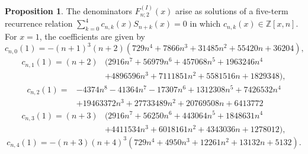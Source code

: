 \documentclass[a4paper,12pt,oneside]{article}
\theoremstyle{definition}
\newtheorem{prop}[defi]{Proposition}
\newcommand{\Z}{\mathbb{Z}}
\begin{document}
\begin{prop}
    The denominators $F_{n;2}^{(I)}(x)$ arise as solutions of a five-term recurrence relation $\sum_{k=0}^4 c_{n,k}(x) S_{n+k}(x)=0$ in which $c_{n,k}(x)\in\Z[x,n]$.
    For $x=1$, the coefficients are given by
    $$c_{n,0}(1) = -(n + 1)^3(n + 2)(729n^4 + 7866n^3 + 31485n^2 + 55420n + 36204), $$
    $$\begin{aligned}
        c_{n,1}(1) = (n + 2)&(2916n^7 + 56979n^6 + 457068n^5 + 1963246n^4 \\
        &+ 4896596n^3 + 7111851n^2 + 5581516n + 1829348),
    \end{aligned} $$
    $$\begin{aligned}
        c_{n,2}(1) = &-4374n^8 - 41364n^7 - 17307n^6 + 1312308n^5 + 7426532n^4 \\
        &+ 19463372n^3 + 27733489n^2 + 20769508n + 6413772
    \end{aligned}$$
    $$\begin{aligned}
        c_{n,3}(1) = (n + 3)&(2916n^7 + 56250n^6 + 443064n^5 + 1848631n^4 \\
    &+ 4411534n^3 + 6018161n^2 + 4343036n + 1278012),
    \end{aligned}$$
    $$c_{n,4}(1) = -(n + 3)(n + 4)^3(729n^4 + 4950n^3 + 12261n^2 + 13132n + 5132).$$  

\end{prop}
\end{document}

